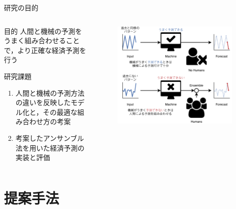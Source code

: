 \documentclass[dvipdfmx,aspectratio=169]{beamer}
\begin{document}
\begin{frame}{研究の目的}
\begin{columns}
  \begin{column}{0.45\textwidth}
    \begin{block}{目的}
      人間と機械の予測をうまく組み合わせることで，より正確な経済予測を行う
    \end{block}
    \begin{alertblock}{研究課題}
      \begin{enumerate}
        \item 人間と機械の予測方法の違いを反映したモデル化と，その最適な組み合わせ方の考案
        \item 考案したアンサンブル法を用いた経済予測の実装と評価
      \end{enumerate}
    \end{alertblock}
  \end{column}
  \begin{column}{0.55\textwidth}
    \begin{figure}
      \centering
      \includegraphics[width=\columnwidth]{slide-schematic.pdf}
    \end{figure}
  \end{column}
\end{columns}
\end{frame}

\section{提案手法}
\end{document}
